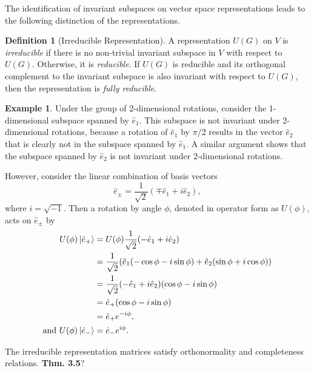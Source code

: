 \documentclass[12pt]{report}
\newcommand{\ehat}{\hat{e}}
\theoremstyle{definition}
\newtheorem{definition}{Definition}[chapter]
\newtheorem{example}{Example}[chapter]
\begin{document}
The identification of invariant subspaces on vector space representations leads to the following distinction of the representations.
\begin{definition}[Irreducible Representation]
    A representation $U(G)$ on $V$ is \textit{irreducible} if there is no non-trivial invariant subspace in $V$ with respect to $U(G)$. Otherwise, it is \textit{reducible}. If $U(G)$ is reducible and its orthogonal complement to the invariant subspace is also invariant with respect to $U(G)$, then the representation is \textit{fully reducible}.
    
\end{definition}

\begin{example}
    Under the group of 2-dimensional rotations, consider the 1-dimensional subspace spanned by $\ehat_1$. This subspace is not invariant under 2-dimensional rotations, because a rotation of $\ehat_1$ by $\pi/2$ results in the vector $\ehat_2$ that is clearly not in the subspace spanned by $\ehat_1$. A similar argument shows that the subspace spanned by $\ehat_2$ is not invariant under 2-dimensional rotations.

    However, consider the linear combination of basis vectors
    \begin{equation}
        \ehat_\pm = \frac{1}{\sqrt{2}}\left( \mp\ehat_1 + i\ehat_2 \right),
    \end{equation}
    where $i = \sqrt{-1}$. Then a rotation by angle $\phi$, denoted in operator form as $U(\phi)$, acts on $\ehat_\pm$ by
    \begin{align}
        U(\phi)\ket{\ehat_+} &= U(\phi)\frac{1}{\sqrt{2}}(-\ehat_1 + i\ehat_2) \\
        &= \frac{1}{\sqrt{2}}(\ehat_1(-\cos\phi-i\sin\phi) + \ehat_2(\sin\phi+i\cos\phi)) \nonumber \\
        &= \frac{1}{\sqrt{2}}(-\ehat_1 + i\ehat_2)(\cos\phi - i\sin\phi) \nonumber \\
        &= \ehat_+ (\cos\phi - i\sin\phi) \nonumber \\
        &= \ehat_+ e^{-i\phi}, \\
        \textrm{and } U(\phi)\ket{\ehat_-} &= \ehat_- e^{i\phi}.
    \end{align}

\end{example}



The irreducible representation matrices satisfy orthonormality and completeness relations.\textbf{ Thm. 3.5}?
\end{document}
